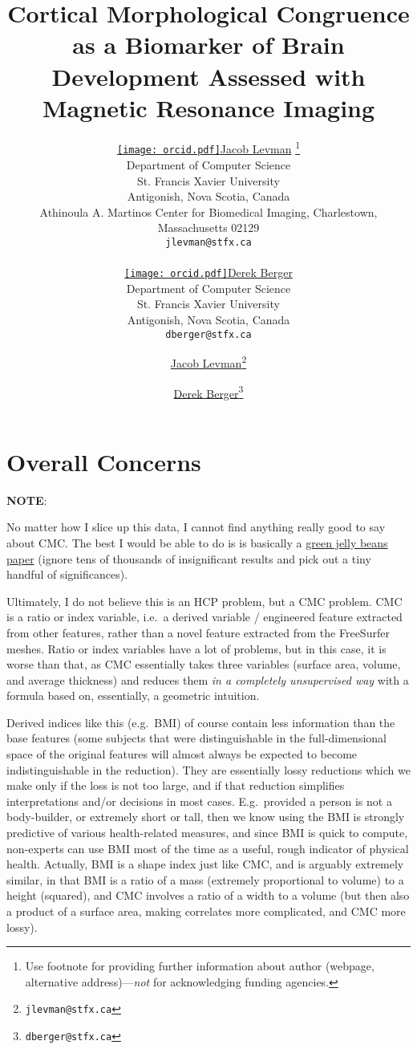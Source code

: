 \documentclass{article}
\title{Cortical Morphological Congruence as a Biomarker of Brain Development Assessed with Magnetic Resonance Imaging}
\author{%
	\href{https://orcid.org/0000-0002-9604-3157}{\texttt{[image: orcid.pdf]}\hspace{1mm}Jacob Levman}
	\thanks{Use footnote for providing further information about author (webpage, alternative address)---\emph{not} for acknowledging funding agencies.} \\
	Department of Computer Science\\
	St. Francis Xavier University\\
	Antigonish, Nova Scotia, Canada\\
	Athinoula A. Martinos Center for Biomedical Imaging, Charlestown, Massachusetts 02129\\
	\texttt{jlevman@stfx.ca} \\

	\And

	\href{https://orcid.org/0000-0003-4733-0624}{\texttt{[image: orcid.pdf]}\hspace{1mm}Derek Berger} \\
	Department of Computer Science\\
	St. Francis Xavier University\\
	Antigonish, Nova Scotia, Canada\\
	\texttt{dberger@stfx.ca} \\
}
\author[1,2]{%
	\href{https://orcid.org/0000-0002-9604-3157}{\usebox{\orcid}\hspace{1mm}Jacob Levman\thanks{\texttt{jlevman@stfx.ca}}}%
}
\author[1]{%
	\href{https://orcid.org/0000-0003-4733-0624}{\usebox{\orcid}\hspace{1mm}Derek Berger\thanks{\texttt{dberger@stfx.ca}}}%
}
\affil[1]{Athinoula A. Martinos Center for Biomedical Imaging, Charlestown, Massachusetts 02129}
\affil[2]{Department of Computer Science, St. Francis Xavier University,Antigonish, Nova Scotia}
\affil[3]{Nova Scotia Health Authority, Halifax, NS, Canada}
\affil[4]{Harvard Medical School, Department of Radiology, Boston, MA, USA.}
\newcommand{\note}[2][cyan]{\textbf{NOTE}: \textcolor{#1}{#2}}
\begin{document}
\maketitle


\color{gray}

\section{Overall Concerns}

\note{}

No matter how I slice up this data, I cannot find anything really good to say
about CMC\@. The best I would be able to do is is basically a
\href{https://xkcd.com/882/}{green jelly beans paper} (ignore tens of thousands
of insignificant results and pick out a tiny handful of significances).

Ultimately, I do not believe this is an HCP problem, but a CMC problem. CMC
is a ratio or index variable, i.e.\ a derived variable / engineered feature
extracted from other features, rather than a novel feature extracted from
the FreeSurfer meshes. Ratio or index variables have a lot of problems, but
in this case, it is worse than that, as CMC essentially takes three variables
(surface area, volume, and average thickness) and reduces them \emph{in a
completely unsupervised way} with a formula based on, essentially, a geometric
intuition.

Derived indices like this (e.g.\ BMI) of course contain less information than
the base features (some subjects that were distinguishable in the
full-dimensional space of the original features will almost always be
expected to become indistinguishable in the reduction). They are essentially
lossy reductions which we make only if the loss is not too large, and if that
reduction simplifies interpretations and/or decisions in most cases. E.g.\
provided a person is not a body-builder, or extremely short or tall, then we
know using the BMI is strongly predictive of various health-related measures,
and since BMI is quick to compute, non-experts can use BMI most of the time
as a useful, rough indicator of physical health. Actually, BMI is a shape
index just like CMC, and is arguably extremely similar, in that BMI is a
ratio of a mass (extremely proportional to volume) to a height (squared), and
CMC involves a ratio of a width to a volume (but then also a product of a
surface area, making correlates more complicated, and CMC more lossy).
\end{document}
